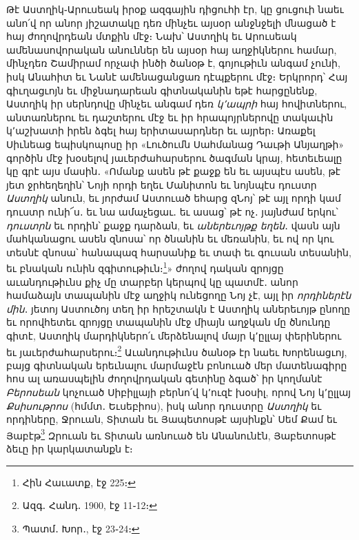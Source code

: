 \documentclass{article}
\begin{document}
{Թէ Աստղիկ֊Արուսեակ իրօք ազգային դիցուհի էր, կը ցուցուի նաեւ անո՛վ որ անոր յիշատակը դեռ մինչեւ այսօր անջնջելի մնացած է հայ ժողովրդեան մտքին մէջ։ Նախ՝ Աստղիկ եւ Արուսեակ ամենասովորական անուններ են այսօր հայ աղջիկներու համար, մինչդեռ Շամիրամ որչափ ինծի ծանօթ է, գոյութիւն անգամ չունի, իսկ Անահիտ եւ Նանէ ամենացանցառ դէպքերու մէջ։ Երկրորդ՝ Հայ գիւղացւոյն եւ միջնադարեան գիտնականին եթէ հարցընենք, Աստղիկ իր սերնդովը մինչեւ անգամ դեռ \emph{կ՚ապրի} հայ հովիտներու, անտառներու եւ դաշտերու մէջ եւ իր հրապոյրներովը տակաւին կ՚աշխատի իրեն ձգել հայ երիտասարդներ եւ այրեր։ Առաքել Սիւնեաց եպիսկոպոսը իր «Լուծումն Սահմանաց Դաւթի Անյաղթի» գործին մէջ խօսելով յաւերժահարսերու ծագման կրայ, հետեւեալը կը գրէ այս մասին․ «Ոմանք ասեն թէ քաջք են եւ այսպէս ասեն, թէ յետ ջրհեղեղին՝ Նոյի որդի եղեւ Մանիտոն եւ նոյնպէս դուստր \emph{Աստղիկ} անուն, եւ յորժամ Աստուած եհարց զՆոյ՝ թէ այլ որդի կամ դուստր ունի՜ս․ եւ նա ամաչեցաւ․ եւ ասաց՝ թէ ոչ․ յայնժամ երկու՝ \emph{դուստրն} եւ որդին՝ քաջք դարձան, եւ \emph{աներեւոյթք եղեն}․ վասն այն մահկանացու ասեն զնոսա՝ որ ծնանին եւ մեռանին, եւ ով որ կու տեսնէ զնոսա՝ հանապազ հարսանիք եւ տափ եւ գուսան տեսանին, եւ բնական ունին զգիտութիւն։\footnote{Հին Հաւատք, էջ 225։}» ժողով դական զրոյցը աւանդութիւնս քիչ մը տարբեր կերպով կը պատմէ․ անոր համաձայն տապանին մէջ աղջիկ ունեցողը Նոյ չէ, այլ իր \emph{որդիներէն մին}․ յետոյ Աստուծոյ տեղ իր հրեշտակն է Աստղիկ աներեւոյթ ընողը եւ որովհետեւ զրոյցը տապանին մէջ միայն աղջկան մը ծնունդը գիտէ, Աստղիկ մարդիկներո՛ւ մերձենալով մայր կ՚ըլլայ փերիներու եւ յաւերժահարսերու։\footnote{Ազգ․ Հանդ․ 1900, էջ 11֊12։} Աւանդութիւնս ծանօթ էր նաեւ Խորենացւոյ, բայց գիտնական երեւնալու մարմաջէն բոնուած մեր մատենագիրը հոս ալ առասպելին ժողովրդական գետինը ձգած՝ իր կողմանէ \emph{Բերոսեան} կոչուած Սիբիլլայի բերնո՛վ կ՚ուզէ խօսիլ, որով Նոյ կ՚ըլլայ \emph{Քսիսութրոս} (հմմտ․ Եւսեբիոս), իսկ անոր դուստրը \emph{Աստղիկ} եւ որդիները, Ջրուան, Տիտան եւ Յապետոսթէ այսինքն՝ Սեմ Քամ եւ Յաբէթ\footnote{Պատմ․ Խոր․, էջ 23֊24։} Զրուան եւ Տիտան առնուած են Անանունէն, Յաբետոսթէ ձեւը իր կարկատանքն է։

}
\end{document}
